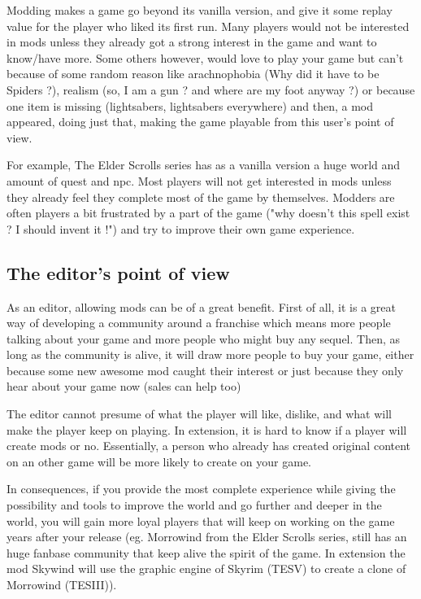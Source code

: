 \documentclass[a4paper,12pt]{article}
\begin{document}
Modding makes a game go beyond its vanilla version, and give it some replay value for the player who liked its first run. Many players would not be interested in mods unless they already got a strong interest in the game and want to know/have more. Some others however, would love to play your game but can't because of some random reason like arachnophobia (Why did it have to be Spiders ?), realism (so, I am a gun ? and where are my foot anyway ?) or because one item is missing (lightsabers, lightsabers everywhere) and then, a mod appeared, doing just that, making the game playable from this user's point of view.

For example, The Elder Scrolls series has as a vanilla version a huge world and amount of quest and npc. Most players will not get interested in mods unless they already feel they complete most of the game by themselves. Modders are often players a bit frustrated by a part of the game ("why doesn't this spell exist ? I should invent it !") and try to improve their own game experience.

\subsection{The editor's point of view}

As an editor, allowing mods can be of a great benefit. First of all, it is a great way of developing a community around a franchise which means more people talking about your game and more people who might buy any sequel. Then, as long as the community is alive, it will draw more people to buy your game, either because some new awesome mod caught their interest or just because they only hear about your game now (sales can help too)

The editor cannot presume of what the player will like, dislike, and what will make the player keep on playing. In extension, it is hard to know if a player will create mods or no. Essentially, a person who already has created original content on an other game will be more likely to create on your game.

In consequences, if you provide the most complete experience while giving the possibility and tools to improve the world and go further and deeper in the world, you will gain more loyal players that will keep on working on the game years after your release (eg. Morrowind from the Elder Scrolls series, still has an huge fanbase community that keep alive the spirit of the game. In extension the mod Skywind will use the graphic engine of Skyrim (TESV) to create a clone of Morrowind (TESIII)).
\end{document}
